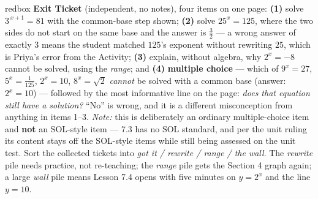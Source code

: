 \documentclass[10pt]{article}
\begin{document}
\begin{skillbox}{redbox}
\textbf{Exit Ticket} (independent, no notes), four items on one page: \textbf{(1)} solve
$3^{\,x+1}=81$ with the common-base step shown; \textbf{(2)} solve $25^{x}=125$, where the two sides
do not start on the same base and the answer is $\frac32$ --- a wrong answer of exactly $3$ means the
student matched $125$'s exponent without rewriting $25$, which is Priya's error from the Activity;
\textbf{(3)} explain, without algebra, why $2^{x}=-8$ cannot be solved, using the \emph{range}; and
\textbf{(4)} \textbf{multiple choice} --- which of $9^{x}=27$, $5^{x}=\frac1{125}$, $2^{x}=10$,
$8^{x}=\sqrt2$ \emph{cannot} be solved with a common base (answer: $2^{x}=10$) --- followed by the most
informative line on the page: \emph{does that equation still have a solution?} ``No'' is wrong, and it
is a different misconception from anything in items 1--3. \emph{Note:} this is deliberately an ordinary
multiple-choice item and \textbf{not} an SOL-style item --- 7.3 has no SOL standard, and per the unit
ruling its content stays off the SOL-style items while still being assessed on the unit test. Sort the
collected tickets into \emph{got it / rewrite / range / the wall}. The \emph{rewrite} pile needs
practice, not re-teaching; the \emph{range} pile gets the Section 4 graph again; a large \emph{wall}
pile means Lesson 7.4 opens with five minutes on $y=2^{x}$ and the line $y=10$.
\end{skillbox}
\end{document}

